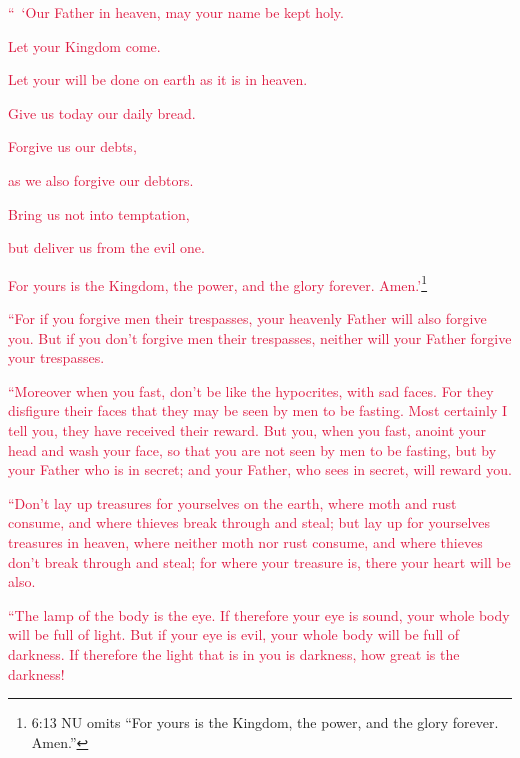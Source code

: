 \textcolor{crimson}{“ ‘Our Father in heaven, may your name be kept holy.
}

\myverse{}\textcolor{crimson}{Let your Kingdom come.
}

\textcolor{crimson}{Let your will be done on earth as it is in heaven.
}

\myverse{}\textcolor{crimson}{Give us today our daily bread.
}

\myverse{}\textcolor{crimson}{Forgive us our debts,}

\textcolor{crimson}{as we also forgive our debtors.
}

\myverse{}\textcolor{crimson}{Bring us not into temptation,}

\textcolor{crimson}{but deliver us from the evil one.}

\textcolor{crimson}{For yours is the Kingdom, the power, and the glory forever. Amen.’}\footnote{6:13 NU omits “For yours is the Kingdom, the power, and the glory forever. Amen.”}

\myverse{}\textcolor{crimson}{“For if you forgive men their trespasses, your heavenly Father
	will also forgive you.
}
\myverse{}\textcolor{crimson}{But if you don’t forgive men their trespasses, neither will your Father
	forgive your trespasses.}

\myverse{}\textcolor{crimson}{“Moreover when you fast, don’t be like the hypocrites, with
	sad faces. For they disfigure their faces that they may be seen by men to be fasting. Most certainly I
	tell you, they have received their reward.
}
\myverse{}\textcolor{crimson}{But you, when you fast, anoint your head and wash your face,
}
\myverse{}\textcolor{crimson}{so that you are not seen by men to be fasting, but by your Father who
	is in secret; and your Father, who sees in secret, will reward you.
}

\myverse{}\textcolor{crimson}{“Don’t lay up treasures for yourselves on the earth, where
	moth and rust consume, and where thieves break through and steal;
}
\myverse{}\textcolor{crimson}{but lay up for yourselves treasures in heaven, where neither moth nor
	rust consume, and where thieves don’t break through and steal;
}
\myverse{}\textcolor{crimson}{for where your treasure is, there your heart will be also.
}

\myverse{}\textcolor{crimson}{“The lamp of the body is the eye. If therefore your eye is
	sound, your whole body will be full of light.
}
\myverse{}\textcolor{crimson}{But if your eye is evil, your whole body will be full of darkness. If
	therefore the light that is in you is darkness, how great is the darkness!
}

